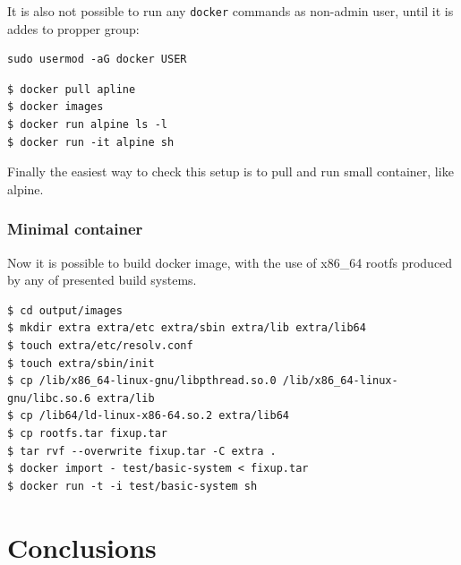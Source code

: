 \documentclass[printmode]{mgr}
\begin{document}
It is also not possible to run any \verb|docker| commands as non-admin user, until it is addes to propper group: \begin{verbatim}
sudo usermod -aG docker USER
\end{verbatim}

\begin{lstlisting}
$ docker pull apline
$ docker images
$ docker run alpine ls -l
$ docker run -it alpine sh
\end{lstlisting}

Finally the easiest way to check this setup is to pull and run small container, like alpine.

\subsection*{Minimal container}

Now it is possible to build docker image, with the use of x86\_64 rootfs produced by any of presented build systems.

\begin{lstlisting}
$ cd output/images
$ mkdir extra extra/etc extra/sbin extra/lib extra/lib64
$ touch extra/etc/resolv.conf
$ touch extra/sbin/init
$ cp /lib/x86_64-linux-gnu/libpthread.so.0 /lib/x86_64-linux-gnu/libc.so.6 extra/lib
$ cp /lib64/ld-linux-x86-64.so.2 extra/lib64
$ cp rootfs.tar fixup.tar
$ tar rvf --overwrite fixup.tar -C extra .
$ docker import - test/basic-system < fixup.tar
$ docker run -t -i test/basic-system sh
\end{lstlisting}






















\chapter{Conclusions}
\label{chapter:conclusions}
\end{document}
